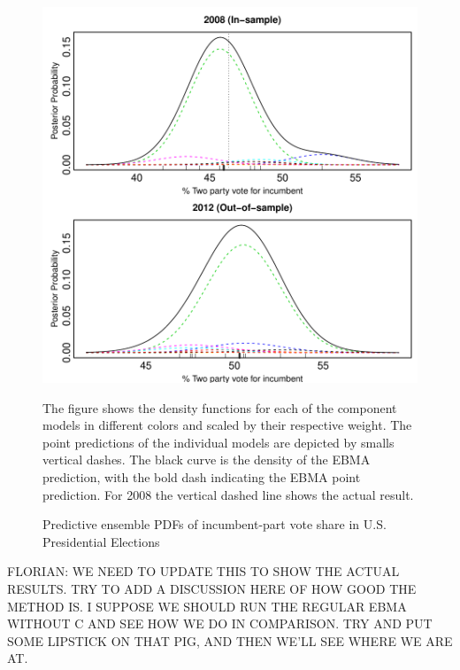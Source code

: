 \documentclass[12pt,fullpage,endnotes]{article}
\begin{document}
\begin{figure}[h]
\caption{Predictive ensemble PDFs of incumbent-part vote share in U.S. Presidential Elections}
\label{pres}
\begin{center}
\includegraphics[scale=.8]{presForecast}
\end{center}
The figure shows the density functions for each of the component
models in different colors and scaled by their respective weight. The
point predictions of the individual models are depicted by smalls
vertical dashes. The black curve is the density of the EBMA
prediction, with the bold dash indicating the EBMA point
prediction. For 2008 the vertical dashed line shows the actual result.
\end{figure}


FLORIAN: WE NEED TO UPDATE THIS TO SHOW THE ACTUAL RESULTS.  TRY TO
ADD A DISCUSSION HERE OF HOW GOOD THE METHOD IS.  I SUPPOSE WE SHOULD
RUN THE REGULAR EBMA WITHOUT C AND SEE HOW WE DO IN COMPARISON.  TRY
AND PUT SOME LIPSTICK ON THAT PIG, AND THEN WE'LL SEE WHERE WE ARE AT.
\end{document}
